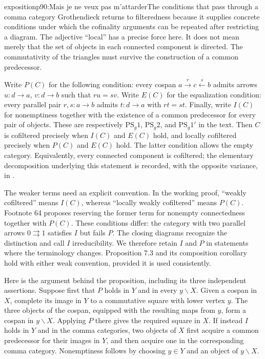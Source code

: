 
\begin{dcomment}{exposition}{p90:Mais je ne veux pas m'attarder}{The conditions that pass through a comma category}
Grothendieck returns to filteredness because it supplies concrete conditions under which the cofinality arguments can be repeated after restricting a diagram. The adjective ``local'' has a precise force here. It does not mean merely that the set of objects in each connected component is directed. The commutativity of the triangles must survive the construction of a common predecessor.

Write $P(C)$ for the following condition: every cospan $a\xrightarrow{r}c\xleftarrow{s}b$ admits arrows $u:d\to a$, $v:d\to b$ such that $ru=sv$. Write $E(C)$ for the equalization condition: every parallel pair $r,s:a\to b$ admits $t:d\to a$ with $rt=st$. Finally, write $I(C)$ for nonemptiness together with the existence of a common predecessor for every pair of objects. These are respectively $\mathrm{PS}_g1$, $\mathrm{PS}_g2$, and $\mathrm{PS}_g1'$ in the text. Then $C$ is cofiltered precisely when $I(C)$ and $E(C)$ hold, and locally cofiltered precisely when $P(C)$ and $E(C)$ hold. The latter condition allows the empty category. Equivalently, every connected component is cofiltered; the elementary decomposition underlying this statement is recorded, with the opposite variance, in \citet[Lemmas 4.19.6 and 4.19.8]{StacksFiltered2026}.

The weaker terms need an explicit convention. In the working proof, ``weakly cofiltered'' means $I(C)$, whereas ``locally weakly cofiltered'' means $P(C)$. Footnote 64 proposes reserving the former term for nonempty connectedness together with $P(C)$. These conditions differ: the category with two parallel arrows $0\rightrightarrows1$ satisfies $I$ but fails $P$. The closing diagrams recognize the distinction and call $I$ irreducibility. We therefore retain $I$ and $P$ in statements where the terminology changes. Proposition 7.3 and its composition corollary hold with either weak convention, provided it is used consistently.

Here is the argument behind the proposition, including its three independent assertions. Suppose first that $P$ holds in $Y$ and in every $y\backslash X$. Given a cospan in $X$, complete its image in $Y$ to a commutative square with lower vertex $y$. The three objects of the cospan, equipped with the resulting maps from $y$, form a cospan in $y\backslash X$. Applying $P$ there gives the required square in $X$. If instead $I$ holds in $Y$ and in the comma categories, two objects of $X$ first acquire a common predecessor for their images in $Y$, and then acquire one in the corresponding comma category. Nonemptiness follows by choosing $y\in Y$ and an object of $y\backslash X$.


\end{dcomment}
